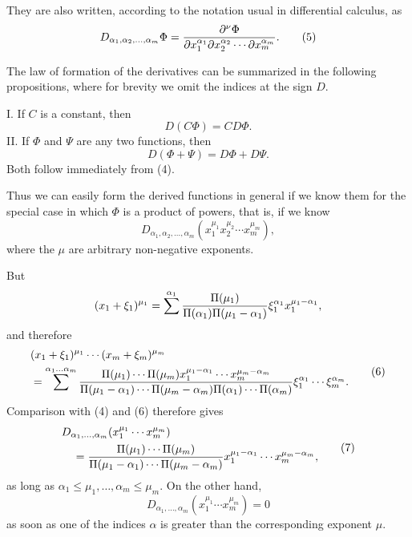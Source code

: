 \documentclass[11pt]{article}
\begin{document}
They are also written, according to the notation usual in differential calculus, as
\begin{equation}
 D_{\alpha_1,\alpha_2,\ldots,\alpha_m}\Phi
 =
 {\partial^\nu\Phi\over
 \partial x_1^{\alpha_1}\partial x_2^{\alpha_2}\cdots\partial x_m^{\alpha_m}}.
\tag{5}
\end{equation}

The law of formation of the derivatives can be summarized in the following propositions, where for brevity we omit the indices at the sign $D$.

I. If $C$ is a constant, then
\[
 D(C\Phi)=CD\Phi.
\]
II. If $\Phi$ and $\Psi$ are any two functions, then
\[
 D(\Phi+\Psi)=D\Phi+D\Psi.
\]
Both follow immediately from (4).

Thus we can easily form the derived functions in general if we know them for the special case in which $\Phi$ is a product of powers, that is, if we know
\[
 D_{\alpha_1,\alpha_2,\ldots,\alpha_m}(x_1^{\mu_1}x_2^{\mu_2}\cdots x_m^{\mu_m}),
\]
where the $\mu$ are arbitrary non-negative exponents.

But
\[
 (x_1+\xi_1)^{\mu_1}
 =\sum^{\alpha_1}{\Pi(\mu_1)\over\Pi(\alpha_1)\Pi(\mu_1-\alpha_1)}
 \xi_1^{\alpha_1}x_1^{\mu_1-\alpha_1},
\]
and therefore
\begin{equation}
\begin{aligned}
&(x_1+\xi_1)^{\mu_1}\cdots(x_m+\xi_m)^{\mu_m}\\
&=\sum^{\alpha_1\ldots\alpha_m}
 {\Pi(\mu_1)\cdots\Pi(\mu_m)x_1^{\mu_1-\alpha_1}\cdots x_m^{\mu_m-\alpha_m}
 \over
 \Pi(\mu_1-\alpha_1)\cdots\Pi(\mu_m-\alpha_m)\Pi(\alpha_1)\cdots\Pi(\alpha_m)}
 \xi_1^{\alpha_1}\cdots\xi_m^{\alpha_m}.
\end{aligned}
\tag{6}
\end{equation}
Comparison with (4) and (6) therefore gives
\begin{equation}
\begin{aligned}
&D_{\alpha_1,\ldots,\alpha_m}(x_1^{\mu_1}\cdots x_m^{\mu_m})\\
&\quad =
{\Pi(\mu_1)\cdots\Pi(\mu_m)\over
 \Pi(\mu_1-\alpha_1)\cdots\Pi(\mu_m-\alpha_m)}
 x_1^{\mu_1-\alpha_1}\cdots x_m^{\mu_m-\alpha_m},
\end{aligned}
\tag{7}
\end{equation}
as long as $\alpha_1\leq\mu_1,\ldots,\alpha_m\leq\mu_m$. On the other hand,
\begin{equation}
 D_{\alpha_1,\ldots,\alpha_m}(x_1^{\mu_1}\cdots x_m^{\mu_m})=0
\tag{8}
\end{equation}
as soon as one of the indices $\alpha$ is greater than the corresponding exponent $\mu$.
\end{document}
